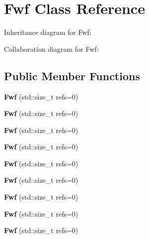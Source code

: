 \hypertarget{class_fwf}{}\section{Fwf Class Reference}
\label{class_fwf}


Inheritance diagram for Fwf\+:


Collaboration diagram for Fwf\+:
\subsection*{Public Member Functions}
\begin{DoxyCompactItemize}
\item 
\mbox{\label{class_fwf_aae656629a3796068759198ef9d7fc5f7}} 
{\bfseries Fwf} (std\+::size\+\_\+t refs=0)
\item 
\mbox{\label{class_fwf_aae656629a3796068759198ef9d7fc5f7}} 
{\bfseries Fwf} (std\+::size\+\_\+t refs=0)
\item 
\mbox{\label{class_fwf_aae656629a3796068759198ef9d7fc5f7}} 
{\bfseries Fwf} (std\+::size\+\_\+t refs=0)
\item 
\mbox{\label{class_fwf_aae656629a3796068759198ef9d7fc5f7}} 
{\bfseries Fwf} (std\+::size\+\_\+t refs=0)
\item 
\mbox{\label{class_fwf_aae656629a3796068759198ef9d7fc5f7}} 
{\bfseries Fwf} (std\+::size\+\_\+t refs=0)
\item 
\mbox{\label{class_fwf_aae656629a3796068759198ef9d7fc5f7}} 
{\bfseries Fwf} (std\+::size\+\_\+t refs=0)
\item 
\mbox{\label{class_fwf_aae656629a3796068759198ef9d7fc5f7}} 
{\bfseries Fwf} (std\+::size\+\_\+t refs=0)
\item 
\mbox{\label{class_fwf_aae656629a3796068759198ef9d7fc5f7}} 
{\bfseries Fwf} (std\+::size\+\_\+t refs=0)
\item 
\mbox{\label{class_fwf_aae656629a3796068759198ef9d7fc5f7}} 
{\bfseries Fwf} (std\+::size\+\_\+t refs=0)
\item 
\mbox{\label{class_fwf_a1500e0ece206c25d97026b41b0363508}} 

\end{DoxyCompactItemize}
